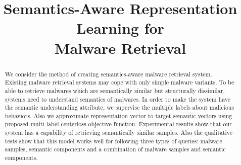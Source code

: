 \documentclass[sigconf, anonymous]{acmart}
\begin{document}
\title{Semantics-Aware Representation Learning for \\
Malware Retrieval} %

\begin{abstract}
%

We consider the method of creating semantics-aware malware retrieval system. Existing malware retrieval systems may cope with only simple malware variants. To be able to retrieve malwares which are semantically similar but structurally dissimilar, systems need to understand semantics of malwares. In order to make the system have the semantic understanding attribute, we supervise the multiple labels about malicious behaviors. Also we approximate representation vector to target semantic vectors using proposed multi-label centerloss objective function. Experimental results show that our system has a capability of retrieving semantically similar samples. Also the qualitative tests show that this model works well for following three types of queries: malware samples, semantic components and a combination of malware samples and semantic components.




\end{abstract}
\end{document}
